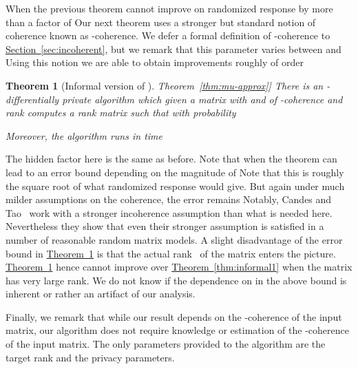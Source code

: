 \documentclass[letterpaper,11pt]{article}
\newtheorem{theorem}{Theorem}[section]
\theoremstyle{definition}
\newcommand{\sectionref}[1]{\hyperref[sec:#1]{Section~\ref{sec:#1}}}
\newcommand{\theoremlabel}[1]{\label{thm:#1}}
\newcommand{\theoremref}[1]{\hyperref[thm:#1]{Theorem~\ref{thm:#1}}}
\begin{document}
When  the previous theorem cannot improve on randomized
response by more than a factor of  Our next theorem uses a
stronger but standard notion of coherence known as -coherence. We
defer a formal definition of -coherence to \sectionref{incoherent}, but
we remark that this parameter varies between  and  Using this notion we
are able to obtain improvements roughly of order 

\begin{theorem}[Informal version of \theoremref{mu-approx}]
\theoremlabel{informal2}
There is an -differentially private algorithm which given a
matrix  with  and of -coherence  and
rank  computes a rank  matrix  such that with
probability 

Moreover, the algorithm runs in time 
\end{theorem}

The hidden factor here is the same as before.   Note that
when  the theorem can lead to an error bound  depending on the magnitude of  Note that this is
roughly the square root of what randomized response would give. But again under
much milder assumptions on the coherence, the error remains
 Notably, Candes and Tao~\cite{CandesT10} work
with a stronger incoherence assumption than what is needed here.
Nevertheless they show that even their stronger assumption is
satisfied in a number of reasonable random matrix models. A slight
disadvantage of the error bound in \theoremref{informal2} is that the actual
rank~ of the matrix enters the picture. \theoremref{informal2} hence cannot
improve over \theoremref{informal1} when the matrix has very large rank. We do
not know if the dependence on  in the above bound is inherent or rather an
artifact of our analysis.

Finally, we remark that while our result depends on the -coherence of the input
matrix, our algorithm does not require knowledge or estimation of the
-coherence of the input matrix. The only parameters provided to the algorithm
are the target rank and the privacy parameters.
\end{document}
